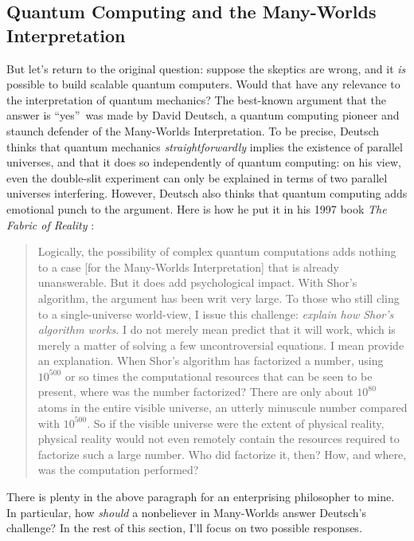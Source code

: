 \documentclass[12pt,onecolumn]{article}%
\begin{document}
\subsection{Quantum Computing and the Many-Worlds Interpretation\label{MWI}}

But let's return to the original question: suppose the skeptics are wrong, and
it \textit{is} possible to build scalable quantum computers. Would that have
any relevance to the interpretation of quantum mechanics? The best-known
argument that the answer is \textquotedblleft yes\textquotedblright\  was made
by David Deutsch, a quantum computing pioneer and staunch defender of the
Many-Worlds Interpretation. To be precise, Deutsch thinks that quantum
mechanics \textit{straightforwardly} implies the existence of parallel
universes, and that it does so independently of quantum computing: on his
view, even the double-slit experiment can only be explained in terms of two
parallel universes interfering. However, Deutsch also thinks that quantum
computing adds emotional punch to the argument. Here is how he put it in his
1997 book \textit{The Fabric of Reality} \cite[p. 217]{deutsch}:

\begin{quotation}
\noindent Logically, the possibility of complex quantum computations adds
nothing to a case [for the Many-Worlds Interpretation] that is already
unanswerable. But it does add psychological impact. With Shor's algorithm,
the argument has been writ very large. To those who still cling to a
single-universe world-view, I issue this challenge: \textit{explain how Shor's
algorithm works.} I do not merely mean predict that it will work, which is
merely a matter of solving a few uncontroversial equations. I mean provide
an explanation. When Shor's algorithm has factorized a number, using
$10^{500}$ or so times the computational resources that can be seen to be
present, where was the number factorized? There are only about $10^{80}%
$ atoms in the entire visible universe, an utterly minuscule number compared
with $10^{500}$. So if the visible universe were the extent of physical
reality, physical reality would not even remotely contain the resources
required to factorize such a large number. Who did factorize it, then?
 How, and where, was the computation performed?
\end{quotation}

There is plenty in the above paragraph for an enterprising philosopher to
mine. In particular, how \textit{should} a nonbeliever in Many-Worlds answer
Deutsch's challenge? In the rest of this section, I'll focus on two possible responses.
\end{document}
